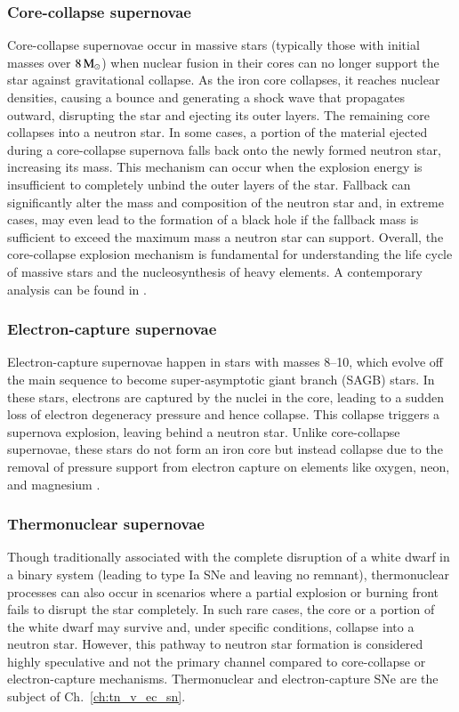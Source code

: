 \documentclass[main.tex]{subfiles}
\begin{document}
    \subsubsection{Core-collapse supernovae}
    Core-collapse supernovae occur in massive stars (typically those with initial masses over $8\mathrm{\,M_\odot}$) when nuclear fusion in their cores can no longer support the star against gravitational collapse. As the iron core collapses, it reaches nuclear densities, causing a bounce and generating a shock wave that propagates outward, disrupting the star and ejecting its outer layers. The remaining core collapses into a neutron star. In some cases, a portion of the material ejected during a core-collapse supernova falls back onto the newly formed neutron star, increasing its mass. This mechanism can occur when the explosion energy is insufficient to completely unbind the outer layers of the star. Fallback can significantly alter the mass and composition of the neutron star and, in extreme cases, may even lead to the formation of a black hole if the fallback mass is sufficient to exceed the maximum mass a neutron star can support. Overall, the core-collapse explosion mechanism is fundamental for understanding the life cycle of massive stars and the nucleosynthesis of heavy elements. A contemporary analysis can be found in \cite{2018ASSL..457....1C}.
    
    \subsubsection{Electron-capture supernovae}
    Electron-capture supernovae happen in stars with masses \numrange{8}{10}\msun, which evolve off the main sequence to become super-asymptotic giant branch (SAGB) stars. In these stars, electrons are captured by the nuclei in the core, leading to a sudden loss of electron degeneracy pressure and hence collapse. This collapse triggers a supernova explosion, leaving behind a neutron star. Unlike core-collapse supernovae, these stars do not form an iron core but instead collapse due to the removal of pressure support from electron capture on elements like oxygen, neon, and magnesium \citep[see also the discussion on O-Ne-Mg cores in Sect.~2.4 of][]{2018ASSL..457....1C}.
    
    \subsubsection{Thermonuclear supernovae}
    Though traditionally associated with the complete disruption of a white dwarf in a binary system (leading to type Ia SNe and leaving no remnant), thermonuclear processes can also occur in scenarios where a partial explosion or burning front fails to disrupt the star completely. In such rare cases, the core or a portion of the white dwarf may survive and, under specific conditions, collapse into a neutron star. However, this pathway to neutron star formation is considered highly speculative and not the primary channel compared to core-collapse or electron-capture mechanisms. Thermonuclear and electron-capture SNe are the subject of Ch.~\ref{ch:tn_v_ec_sn}.
    
\end{document}
